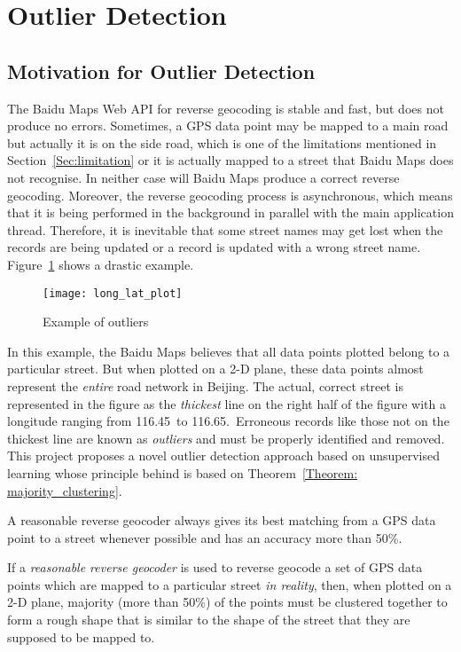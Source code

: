 \section{Outlier Detection}\label{outlier_detecting}
\subsection{Motivation for Outlier Detection}
The Baidu Maps Web API for reverse geocoding is stable and fast, but does not produce no errors. Sometimes, a GPS data point may be mapped to a main road but actually it is on the side road, which is one of the limitations mentioned in Section~\ref{Sec:limitation} or it is actually mapped to a street that Baidu Maps does not recognise. In neither case will Baidu Maps produce a correct reverse geocoding. Moreover, the reverse geocoding process is asynchronous, which means that it is being performed in the background in parallel with the main application thread. Therefore, it is inevitable that some street names may get lost when the records are being updated or a record is updated with a wrong street name. Figure~\ref{Fig:exmp_outlier} shows a drastic example.

\begin{figure}[h]
\texttt{[image: long\_lat\_plot]}
\centering
\caption{Example of outliers}\label{Fig:exmp_outlier}
\end{figure}

In this example, the Baidu Maps believes that all data points plotted belong to a particular street. But when plotted on a 2-D plane, these data points almost represent the \emph{entire} road network in Beijing. The actual, correct street is represented in the figure as the \emph{thickest} line on the right half of the figure with a longitude ranging from 116.45\textdegree~to 116.65\textdegree.~Erroneous records like those not on the thickest line are known as \emph{outliers} and must be properly identified and removed. This project proposes a novel outlier detection approach based on unsupervised learning whose principle behind is based on Theorem~\ref{Theorem: majority_clustering}.

\begin{defn}\label{Def:reasonable_geocoder}
A reasonable reverse geocoder always gives its best matching from a GPS data point to a street whenever possible and has an accuracy more than 50\%.
\end{defn}

\begin{theorem}\label{Theorem: majority_clustering}
If a \emph{reasonable reverse geocoder} is used to reverse geocode a set of GPS data points which are mapped to a particular street \emph{in reality}, then, when plotted on a 2-D plane, majority (more than 50\%) of the points must be clustered together to form a rough shape that is similar to the shape of the street that they are supposed to be mapped to. 
\end{theorem}

